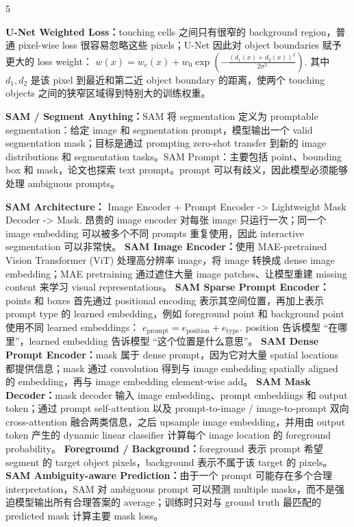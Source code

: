 \documentclass[a4paper, landscape]{article}
\begin{document}
\begin{multicols}{5}
\par \textbf{U-Net Weighted Loss：}touching cells 之间只有很窄的 background region，普通 pixel-wise loss 很容易忽略这些 pixels；U-Net 因此对 object boundaries 赋予更大的 loss weight：
\(
w(x)=w_c(x)+w_0
\exp\left(
-\frac{(d_1(x)+d_2(x))^2}{2\sigma^2}
\right).
\)
其中 \(d_1,d_2\) 是该 pixel 到最近和第二近 object boundary 的距离，使两个 touching objects 之间的狭窄区域得到特别大的训练权重。

\par \textbf{SAM / Segment Anything：}SAM 将 segmentation 定义为 promptable segmentation：给定 image 和 segmentation prompt，模型输出一个 valid segmentation mask；目标是通过 prompting zero-shot transfer 到新的 image distributions 和 segmentation tasks。SAM Prompt：主要包括 point、bounding box 和 mask，论文也探索 text prompt。prompt 可以有歧义，因此模型必须能够处理 ambiguous prompts。

\par \textbf{SAM Architecture：} Image Encoder + Prompt Encoder -> Lightweight Mask Decoder -> Mask.
昂贵的 image encoder 对每张 image 只运行一次；同一个 image embedding 可以被多个不同 prompts 重复使用，因此 interactive segmentation 可以非常快。
\textbf{SAM Image Encoder：}使用 MAE-pretrained Vision Transformer (ViT) 处理高分辨率 image，将 image 转换成 dense image embedding；MAE pretraining 通过遮住大量 image patches、让模型重建 missing content 来学习 visual representations。
\textbf{SAM Sparse Prompt Encoder：}points 和 boxes 首先通过 positional encoding 表示其空间位置，再加上表示 prompt type 的 learned embedding，例如 foreground point 和 background point 使用不同 learned embeddings：
\(
e_{\mathrm{prompt}}
=
e_{\mathrm{position}}+e_{\mathrm{type}}.
\)
position 告诉模型 ``在哪里''，learned embedding 告诉模型 ``这个位置是什么意思''。
\textbf{SAM Dense Prompt Encoder：}mask 属于 dense prompt，因为它对大量 spatial locations 都提供信息；mask 通过 convolution 得到与 image embedding spatially aligned 的 embedding，再与 image embedding element-wise add。
\textbf{SAM Mask Decoder：}mask decoder 输入 image embedding、prompt embeddings 和 output token；通过 prompt self-attention 以及 prompt-to-image / image-to-prompt 双向 cross-attention 融合两类信息，之后 upsample image embedding，并用由 output token 产生的 dynamic linear classifier 计算每个 image location 的 foreground probability。
\textbf{Foreground / Background：}foreground 表示 prompt 希望 segment 的 target object pixels，background 表示不属于该 target 的 pixels。
\textbf{SAM Ambiguity-aware Prediction：}由于一个 prompt 可能存在多个合理 interpretation，SAM 对 ambiguous prompt 可以预测 multiple masks，而不是强迫模型输出所有合理答案的 average；训练时只对与 ground truth 最匹配的 predicted mask 计算主要 mask loss。


\end{multicols}
\end{document}
